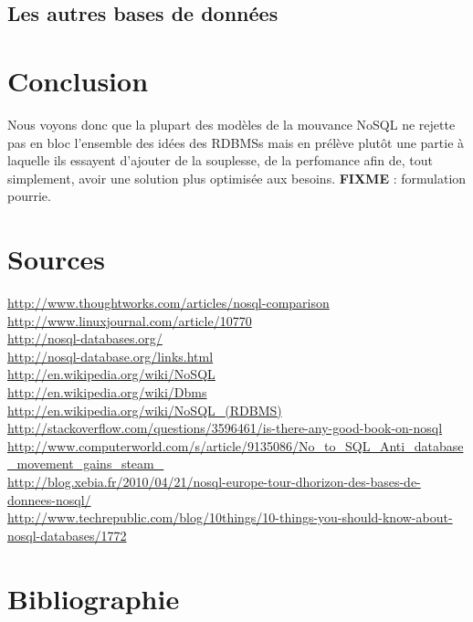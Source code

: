 \documentclass[11pt]{article}
\begin{document}
\subsection{Les autres bases de données}

\section{Conclusion}
Nous voyons donc que la plupart des modèles de la mouvance NoSQL ne rejette pas en bloc l'ensemble des idées des RDBMSs mais en prélève plutôt une partie à laquelle ils essayent d'ajouter de la souplesse, de la perfomance afin de, tout simplement, avoir une solution plus optimisée aux besoins. \colorbox{BrickRed}{\textbf{FIXME} : formulation pourrie.}
\section*{Sources}
\url{http://www.thoughtworks.com/articles/nosql-comparison} \\
\url{http://www.linuxjournal.com/article/10770} \\
\url{http://nosql-databases.org/} \\
\url{http://nosql-database.org/links.html} \\
\url{http://en.wikipedia.org/wiki/NoSQL} \\
\url{http://en.wikipedia.org/wiki/Dbms} \\
\url{http://en.wikipedia.org/wiki/NoSQL_(RDBMS)} \\
\url{http://stackoverflow.com/questions/3596461/is-there-any-good-book-on-nosql} \\
\url{http://www.computerworld.com/s/article/9135086/No_to_SQL_Anti_database_movement_gains_steam_} \\
\url{http://blog.xebia.fr/2010/04/21/nosql-europe-tour-dhorizon-des-bases-de-donnees-nosql/} \\
\url{http://www.techrepublic.com/blog/10things/10-things-you-should-know-about-nosql-databases/1772} \\

\newpage
\section{Bibliographie}
\nocite{*}
\printbibliography
\end{document}
